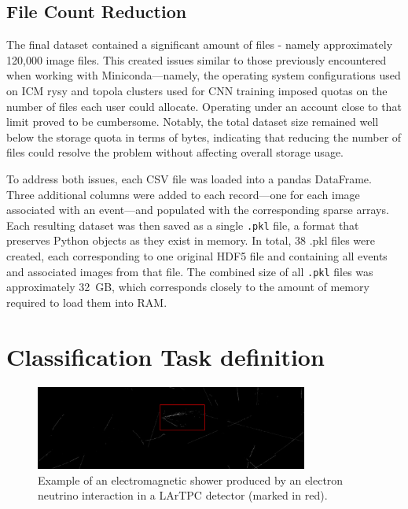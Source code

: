 \documentclass{pracalicmgr}
\begin{document}
\subsection{File Count Reduction}

The final dataset contained a significant amount of files - namely approximately 120,000 image files. This created issues similar to those previously encountered when working with Miniconda—namely, the operating system configurations used on ICM rysy and topola clusters used for CNN training imposed quotas on the number of files each user could allocate. Operating under an account close to that limit proved to be cumbersome. Notably, the total dataset size remained well below the storage quota in terms of bytes, indicating that reducing the number of files could resolve the problem without affecting overall storage usage.

To address both issues, each CSV file was loaded into a pandas DataFrame. Three additional columns were added to each record—one for each image associated with an event—and populated with the corresponding sparse arrays. Each resulting dataset was then saved as a single \texttt{.pkl} file, a format that preserves Python objects as they exist in memory. In total, 38 .pkl files were created, each corresponding to one original HDF5 file and containing all events and associated images from that file. The combined size of all \texttt{.pkl} files was approximately 32~GB, which corresponds closely to the amount of memory required to load them into RAM.

\section{Classification Task definition}

\begin{figure}[H]
\centering
\includegraphics[width=0.8\textwidth]{src/electronShower.pdf}
\caption{Example of an electromagnetic shower produced by an electron neutrino interaction in a LArTPC detector (marked in red).}
\label{fig:electron_shower}
\end{figure}
\end{document}
